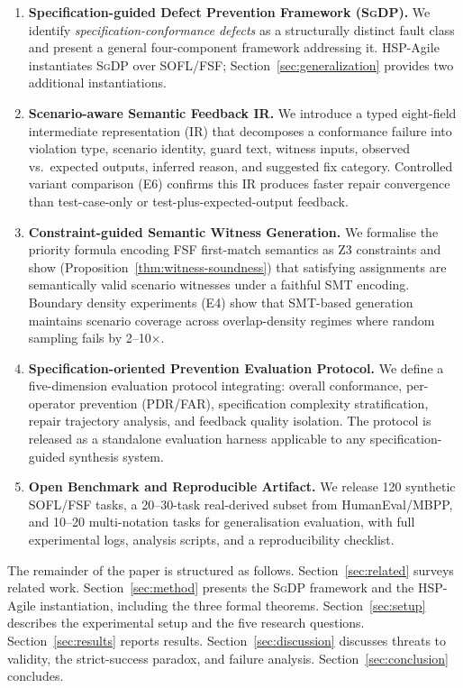 \begin{enumerate}
  \item \textbf{Specification-guided Defect Prevention Framework (\textsc{SgDP}).}
    We identify \emph{specification-conformance defects} as a structurally distinct fault
    class and present a general four-component framework addressing it. HSP-Agile
    instantiates \textsc{SgDP} over SOFL/FSF; Section~\ref{sec:generalization} provides
    two additional instantiations.

  \item \textbf{Scenario-aware Semantic Feedback IR.}
    We introduce a typed eight-field intermediate representation (IR) that decomposes a
    conformance failure into violation type, scenario identity, guard text, witness inputs,
    observed vs.\ expected outputs, inferred reason, and suggested fix category.
    Controlled variant comparison (E6) confirms this IR produces faster repair convergence
    than test-case-only or test-plus-expected-output feedback.

  \item \textbf{Constraint-guided Semantic Witness Generation.}
    We formalise the priority formula encoding FSF first-match semantics as Z3 constraints
    and show (Proposition~\ref{thm:witness-soundness}) that satisfying assignments are
    semantically valid scenario witnesses under a faithful SMT encoding.  Boundary density experiments (E4) show that
    SMT-based generation maintains scenario coverage across overlap-density regimes where
    random sampling fails by 2--10$\times$.

  \item \textbf{Specification-oriented Prevention Evaluation Protocol.}
    We define a five-dimension evaluation protocol integrating: overall conformance,
    per-operator prevention (PDR/FAR), specification complexity stratification, repair
    trajectory analysis, and feedback quality isolation. The protocol is released as a
    standalone evaluation harness applicable to any specification-guided synthesis system.

  \item \textbf{Open Benchmark and Reproducible Artifact.}
    We release 120 synthetic SOFL/FSF tasks, a 20--30-task real-derived subset from
    HumanEval/MBPP, and 10--20 multi-notation tasks for generalisation evaluation, with
    full experimental logs, analysis scripts, and a reproducibility checklist.
\end{enumerate}

The remainder of the paper is structured as follows.
Section~\ref{sec:related} surveys related work.
Section~\ref{sec:method} presents the \textsc{SgDP} framework and the HSP-Agile instantiation, including the three formal theorems.
Section~\ref{sec:setup} describes the experimental setup and the five research questions.
Section~\ref{sec:results} reports results.
Section~\ref{sec:discussion} discusses threats to validity, the strict-success paradox, and failure analysis.
Section~\ref{sec:conclusion} concludes.
